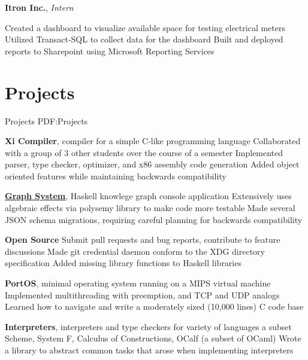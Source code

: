 \documentclass[letterpaper,10pt,oneside]{simpleresume}
\newcommand{\JobHeading}[3]{%
#1
\hfill
\pbox[t][0pt]{\textwidth}{%
\minibox[t,r]{%
#2 \\
#3
}
}
}
\begin{document}
\begin{minipage}[t][0pt]{\linewidth}
\begin{body}
\JobHeading%
{\textbf{Itron Inc.}, \emph{Intern}}
{\DatestampYMD{2017}{06}{23} --- \DatestampYMD{2017}{08}{18}}
{Oconee, SC}
\BulletItem%
Created a dashboard to visualize available space for testing electrical meters
\BulletItem%
Utilized Transact-SQL to collect data for the dashboard
\BulletItem%
Built and deployed reports to Sharepoint using Microsoft Reporting Services


\section%
{Projects}
{Projects}
{PDF:Projects}

\textbf{Xi Compiler}, compiler for a simple C-like programming language
\BulletItem%
Collaborated with a group of 3 other students over the course of a semester
\BulletItem%
Implemented parser, type checker, optimizer, and x86 assembly code generation
\BulletItem%
Added object oriented features while maintaining backwards compatibility
\GapNoBreak%

\href{https://github.com/lehmacdj/graph}{\textbf{Graph System}},
Haskell knowlege graph console application
\BulletItem%
Extensively uses algebraic effects via polysemy library to make code more testable
\BulletItem%
Made several JSON schema migrations, requiring careful planning for backwards compatibility
\GapNoBreak%

\textbf{Open Source}
\BulletItem%
Submit pull requests and bug reports, contribute to feature discussions
\BulletItem%
Made git credential daemon conform to the XDG directory specification
\BulletItem%
Added missing library functions to Haskell libraries
\GapNoBreak%

\textbf{PortOS}, minimal operating system running on a MIPS virtual machine
\BulletItem%
Implemented multithreading with preemption, and TCP and UDP analogs
\BulletItem%
Learned how to navigate and write a moderately sized (10,000 lines) C code base
\GapNoBreak%

\textbf{Interpreters}, interpreters and type checkers for variety of languages
\BulletItem%
a subset Scheme, System F, Calculus of Constructions, OCalf (a subset of OCaml)
\BulletItem%
Wrote a library to abstract common tasks that arose when implementing
interpreters
\GapNoBreak%


\end{body}
\end{minipage}
\end{document}
